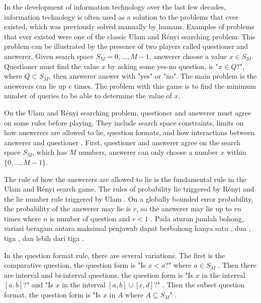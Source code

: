 \documentclass[conference,compsoc]{IEEEtran}
\begin{document}
In the development of information technology over the last few decades, information technology is often used as a solution to the problems that ever existed, which was previously solved manually by humans. Examples of problems that ever existed were one of the classic Ulam and Rényi searching problem. This problem can be illustrated by the presence of two players called questioner and answerer. Given search space $S_M = {0,\ldots,M-1}$, answerer choose a value $x \in S_M$. Questioner must find the value $x$ by asking some yes-no question, is "$x \in Q$?", where $Q \subset S_M$, then answerer answer with "yes" or "no". The main problem is the answerers can lie up $e$ times. The problem with this game is to find the minimum number of queries to be able to determine the value of $x$.


On the Ulam and Rényi searching problem, questioner and answerer must agree on some rules before playing. They include search space constraints, limits on how answerers are allowed to lie, question formats, and how interactions between answerer and questioner \cite{Pelc2002}. First, questioner and answerer agree on the search space $S_M$, which has $M$ numbers, answerer can only choose a number $x$ within $\{0,\ldots,M-1\}$.

The rule of how the answerers are allowed to lie is the fundamental rule in the Ulam and Rényi search game. The rules of probability lie triggered by Rényi and the lie number rule triggered by Ulam \cite{Ulam1991}. On a globally bounded error probability, the probability of the answerer may lie is $r$, so the answerer may lie up to $rn$ times where $n$ is number of question and $r<1$ \cite{Dhagat1992}. Pada aturan jumlah bohong, variasi beragam antara maksimal penjawab dapat berbohong hanya satu \cite{Ellis2008} \cite{Pelc1988}, dua \cite{Cicalese2000}, tiga \cite{Negro1992}, dan lebih dari tiga \cite{Berlekamp1998} \cite{Deppe2004}.

In the question format rule, there are several variations. The first is the comparative question, the question form is "Is $x<a$?" where $a \in S_M$ \cite{Innes} \cite{Auletta1992}. Then there are interval and bi-interval questions, the question form is "Is $x$ in the interval $[a, b]$?" \cite{Peter2017} and "Is $x$ in the interval $[a, b] \cup [c, d]$?" \cite{Mundici1997}. Then the subset question format, the question form is "Is $x$ in $A$ where $A \subseteq S_M$" \cite{Katona} \cite{Macula1997}.
\end{document}
